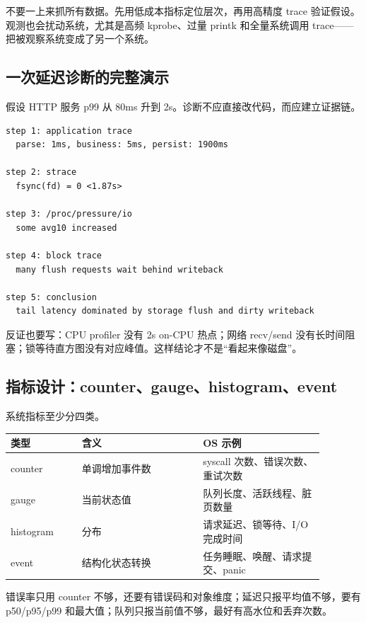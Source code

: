 \begin{warningbox}
不要一上来抓所有数据。先用低成本指标定位层次，再用高精度 trace 验证假设。观测也会扰动系统，尤其是高频 kprobe、过量 printk 和全量系统调用 trace——把被观察系统变成了另一个系统。
\end{warningbox}

\subsection{一次延迟诊断的完整演示}

假设 HTTP 服务 p99 从 80ms 升到 2s。诊断不应直接改代码，而应建立证据链。

\begin{lstlisting}
step 1: application trace
  parse: 1ms, business: 5ms, persist: 1900ms

step 2: strace
  fsync(fd) = 0 <1.87s>

step 3: /proc/pressure/io
  some avg10 increased

step 4: block trace
  many flush requests wait behind writeback

step 5: conclusion
  tail latency dominated by storage flush and dirty writeback
\end{lstlisting}

反证也要写：CPU profiler 没有 2s on-CPU 热点；网络 recv/send 没有长时间阻塞；锁等待直方图没有对应峰值。这样结论才不是“看起来像磁盘”。

\subsection{指标设计：counter、gauge、histogram、event}

系统指标至少分四类。

\begin{longtable}{|L{0.2\linewidth}|L{0.34\linewidth}|L{0.34\linewidth}|}
\toprule
类型 & 含义 & OS 示例 \\
\midrule
counter & 单调增加事件数 & syscall 次数、错误次数、重试次数 \\\tablerowrule
gauge & 当前状态值 & 队列长度、活跃线程、脏页数量 \\\tablerowrule
histogram & 分布 & 请求延迟、锁等待、I/O 完成时间 \\\tablerowrule
event & 结构化状态转换 & 任务睡眠、唤醒、请求提交、panic \\
\bottomrule
\end{longtable}

错误率只用 counter 不够，还要有错误码和对象维度；延迟只报平均值不够，要有 p50/p95/p99 和最大值；队列只报当前值不够，最好有高水位和丢弃次数。

